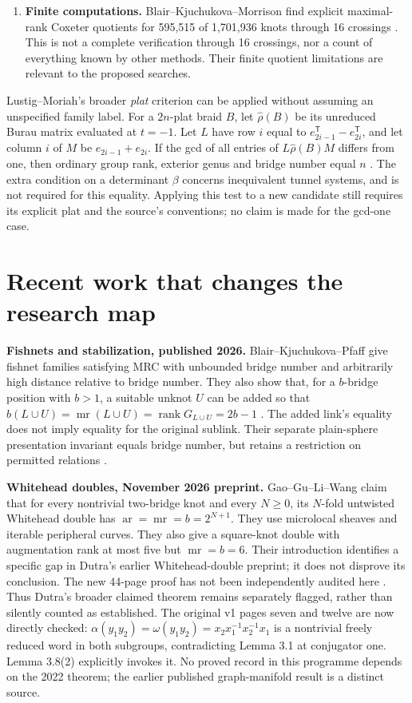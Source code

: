 \documentclass[11pt]{article}
\newcommand{\mr}{\operatorname{mr}}
\begin{document}
\begin{enumerate}
\item \textbf{Finite computations.} Blair--Kjuchukova--Morrison find
explicit maximal-rank Coxeter quotients for 595,515 of 1,701,936 knots
through 16 crossings \cite{bkm}. This is not a complete verification
through 16 crossings, nor a count of everything known by other methods.
Their finite quotient limitations are relevant to the proposed searches.
\end{enumerate}

Lustig--Moriah's broader \emph{plat} criterion can be applied without
assuming an unspecified family label. For a $2n$-plat braid $B$, let
$\widehat\rho(B)$ be its unreduced Burau matrix evaluated at $t=-1$.
Let $L$ have row $i$ equal to $e_{2i-1}^{\mathsf T}-e_{2i}^{\mathsf T}$,
and let column $i$ of $M$ be $e_{2i-1}+e_{2i}$. If the gcd of all
entries of $L\widehat\rho(B)M$ differs from one, then ordinary group
rank, exterior genus and bridge number equal $n$ \cite[Theorem 4.20]{moriah}.
The extra condition on a determinant $\beta$ concerns inequivalent
tunnel systems, and is not required for this equality. Applying this
test to a new candidate still requires its explicit plat and the
source's conventions; no claim is made for the gcd-one case.

\section{Recent work that changes the research map}

\textbf{Fishnets and stabilization, published 2026.}
Blair--Kjuchukova--Pfaff give fishnet families satisfying MRC with
unbounded bridge number and arbitrarily high distance relative to bridge
number. They also show that, for a $b$-bridge position with $b>1$, a
suitable unknot $U$ can be added so that
$b(L\cup U)=\mr(L\cup U)=\operatorname{rank}G_{L\cup U}=2b-1$
\cite{fishnet}. The added link's equality does not imply equality for the
original sublink. Their separate plain-sphere presentation invariant equals
bridge number, but retains a restriction on permitted relations \cite{plain}.

\textbf{Whitehead doubles, November 2026 preprint.}
Gao--Gu--Li--Wang claim that for every nontrivial two-bridge knot and every
$N\ge0$, its $N$-fold untwisted Whitehead double has
$\operatorname{ar}=\mr=b=2^{N+1}$. They use microlocal sheaves and iterable
peripheral curves. They also give a square-knot double with augmentation
rank at most five but $\mr=b=6$. Their introduction identifies a specific
gap in Dutra's earlier Whitehead-double preprint; it does not disprove
its conclusion. The new 44-page proof has not been independently audited
here \cite{whitehead}. Thus Dutra's broader claimed theorem remains
separately flagged, rather than silently counted as established.
The original v1 pages seven and twelve are now directly checked:
$\alpha(y_1y_2)=\omega(y_1y_2)=x_2x_1^{-1}x_2^{-1}x_1$ is a
nontrivial freely reduced word in both subgroups, contradicting
Lemma 3.1 at conjugator one. Lemma 3.8(2) explicitly invokes it.
No proved record in this programme depends on the 2022 theorem;
the earlier published graph-manifold result is a distinct source.
\end{document}
